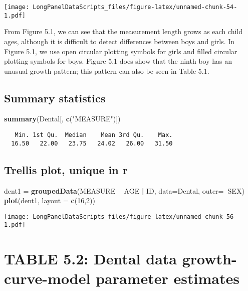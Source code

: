 \documentclass[]{book}
\newenvironment{Shaded}{\begin{snugshade}}{\end{snugshade}}
\newcommand{\DataTypeTok}[1]{\textcolor[rgb]{0.13,0.29,0.53}{#1}}
\newcommand{\DecValTok}[1]{\textcolor[rgb]{0.00,0.00,0.81}{#1}}
\newcommand{\KeywordTok}[1]{\textcolor[rgb]{0.13,0.29,0.53}{\textbf{#1}}}
\newcommand{\NormalTok}[1]{#1}
\newcommand{\OperatorTok}[1]{\textcolor[rgb]{0.81,0.36,0.00}{\textbf{#1}}}
\newcommand{\StringTok}[1]{\textcolor[rgb]{0.31,0.60,0.02}{#1}}
\begin{document}
\texttt{[image: LongPanelDataScripts\_files/figure-latex/unnamed-chunk-54-1.pdf]}

From Figure 5.1, we can see that the measurement length grows as each child ages, although it is difficult to detect differences between boys and girls. In Figure 5.1, we use open circular plotting symbols for girls and filled circular plotting symbols for boys. Figure 5.1 does show that the ninth boy has an unusual growth pattern; this pattern can also be seen in Table 5.1.

\hypertarget{summary-statistics}{%
\subsection{Summary statistics}\label{summary-statistics}}

\begin{Shaded}
\begin{Highlighting}[]
\KeywordTok{summary}\NormalTok{(Dental[, }\KeywordTok{c}\NormalTok{(}\StringTok{"MEASURE"}\NormalTok{)])}
\end{Highlighting}
\end{Shaded}

\begin{verbatim}
   Min. 1st Qu.  Median    Mean 3rd Qu.    Max. 
  16.50   22.00   23.75   24.02   26.00   31.50 
\end{verbatim}

\hypertarget{trellis-plot-unique-in-r}{%
\subsection{Trellis plot, unique in r}\label{trellis-plot-unique-in-r}}

\begin{Shaded}
\begin{Highlighting}[]
\NormalTok{dent1 =}\StringTok{ }\KeywordTok{groupedData}\NormalTok{(MEASURE }\OperatorTok{~}\StringTok{ }\NormalTok{AGE }\OperatorTok{|}\StringTok{ }\NormalTok{ID, }\DataTypeTok{data=}\NormalTok{Dental, }\DataTypeTok{outer=}\OperatorTok{~}\NormalTok{SEX)}
\KeywordTok{plot}\NormalTok{(dent1, }\DataTypeTok{layout =} \KeywordTok{c}\NormalTok{(}\DecValTok{16}\NormalTok{,}\DecValTok{2}\NormalTok{))}
\end{Highlighting}
\end{Shaded}

\texttt{[image: LongPanelDataScripts\_files/figure-latex/unnamed-chunk-56-1.pdf]}

\hypertarget{table-5.2-dental-data-growth-curve-model-parameter-estimates}{%
\section{TABLE 5.2: Dental data growth-curve-model parameter estimates}\label{table-5.2-dental-data-growth-curve-model-parameter-estimates}}
\end{document}
